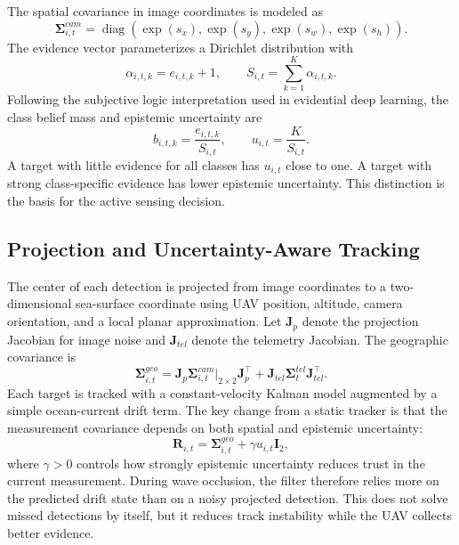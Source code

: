 \documentclass[runningheads]{llncs}
\newcommand{\operatorname}[1]{\mathop{\mathrm{#1}}}
\begin{document}
The spatial covariance in image coordinates is modeled as
\begin{equation}
  \boldsymbol{\Sigma}^{cam}_{i,t} =
  \operatorname{diag}\!\left(\exp(s_x),\exp(s_y),\exp(s_w),\exp(s_h)\right).
\end{equation}
The evidence vector parameterizes a Dirichlet distribution with
\begin{equation}
  \alpha_{i,t,k}=e_{i,t,k}+1, \qquad
  S_{i,t}=\sum_{k=1}^{K}\alpha_{i,t,k}.
\end{equation}
Following the subjective logic interpretation used in evidential deep learning, the class belief mass and epistemic uncertainty are
\begin{equation}
  b_{i,t,k}=\frac{e_{i,t,k}}{S_{i,t}}, \qquad
  u_{i,t}=\frac{K}{S_{i,t}}.
  \label{eq:edl}
\end{equation}
A target with little evidence for all classes has $u_{i,t}$ close to one. A target with strong class-specific evidence has lower epistemic uncertainty. This distinction is the basis for the active sensing decision.

\subsection{Projection and Uncertainty-Aware Tracking}

The center of each detection is projected from image coordinates to a two-dimensional sea-surface coordinate using UAV position, altitude, camera orientation, and a local planar approximation. Let $\mathbf{J}_p$ denote the projection Jacobian for image noise and $\mathbf{J}_{tel}$ denote the telemetry Jacobian. The geographic covariance is
\begin{equation}
  \boldsymbol{\Sigma}^{geo}_{i,t}
  =\mathbf{J}_p\boldsymbol{\Sigma}^{cam}_{i,t}\big|_{2\times2}\mathbf{J}_p^{\top}
  +\mathbf{J}_{tel}\boldsymbol{\Sigma}^{tel}_{t}\mathbf{J}_{tel}^{\top}.
  \label{eq:geo_cov}
\end{equation}
Each target is tracked with a constant-velocity Kalman model augmented by a simple ocean-current drift term. The key change from a static tracker is that the measurement covariance depends on both spatial and epistemic uncertainty:
\begin{equation}
  \mathbf{R}_{i,t}=\boldsymbol{\Sigma}^{geo}_{i,t}+\gamma u_{i,t}\mathbf{I}_2,
  \label{eq:measurement_cov}
\end{equation}
where $\gamma>0$ controls how strongly epistemic uncertainty reduces trust in the current measurement. During wave occlusion, the filter therefore relies more on the predicted drift state than on a noisy projected detection. This does not solve missed detections by itself, but it reduces track instability while the UAV collects better evidence.
\end{document}
